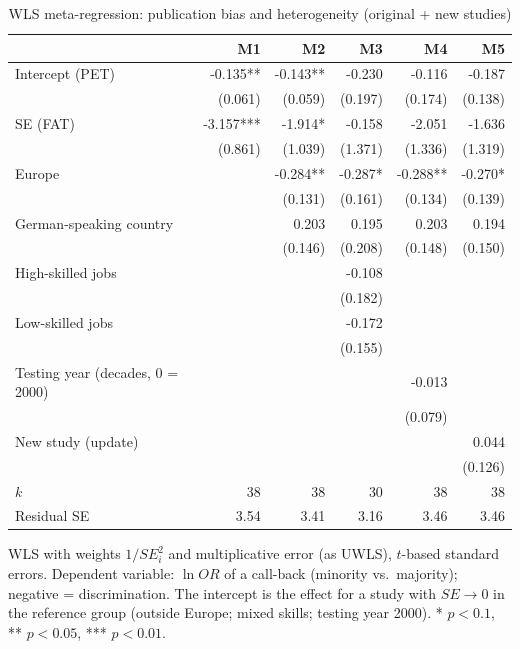 \begin{table}[htbp]
\centering
\small
\caption{WLS meta-regression: publication bias and heterogeneity (original + new studies)}
\label{tab:metareg-wls}
\begin{tabular}{lrrrrr}
\toprule
 & M1 & M2 & M3 & M4 & M5 \\
\midrule
Intercept (PET) & -0.135** & -0.143** & -0.230 & -0.116 & -0.187 \\
 & (0.061) & (0.059) & (0.197) & (0.174) & (0.138) \\
SE (FAT) & -3.157*** & -1.914* & -0.158 & -2.051 & -1.636 \\
 & (0.861) & (1.039) & (1.371) & (1.336) & (1.319) \\
Europe &  & -0.284** & -0.287* & -0.288** & -0.270* \\
 &  & (0.131) & (0.161) & (0.134) & (0.139) \\
German-speaking country &  & 0.203 & 0.195 & 0.203 & 0.194 \\
 &  & (0.146) & (0.208) & (0.148) & (0.150) \\
High-skilled jobs &  &  & -0.108 &  &  \\
 &  &  & (0.182) &  &  \\
Low-skilled jobs &  &  & -0.172 &  &  \\
 &  &  & (0.155) &  &  \\
Testing year (decades, 0 = 2000) &  &  &  & -0.013 &  \\
 &  &  &  & (0.079) &  \\
New study (update) &  &  &  &  & 0.044 \\
 &  &  &  &  & (0.126) \\
\midrule
$k$ & 38 & 38 & 30 & 38 & 38 \\
Residual SE & 3.54 & 3.41 & 3.16 & 3.46 & 3.46 \\
\bottomrule
\end{tabular}
\par\smallskip\parbox{0.95\linewidth}{\footnotesize WLS with weights $1/SE_i^2$ and multiplicative error (as UWLS), $t$-based standard errors. Dependent variable: $\ln OR$ of a call-back (minority vs.\ majority); negative = discrimination. The intercept is the effect for a study with $SE\to 0$ in the reference group (outside Europe; mixed skills; testing year 2000). * $p<0.1$, ** $p<0.05$, *** $p<0.01$.}
\end{table}
